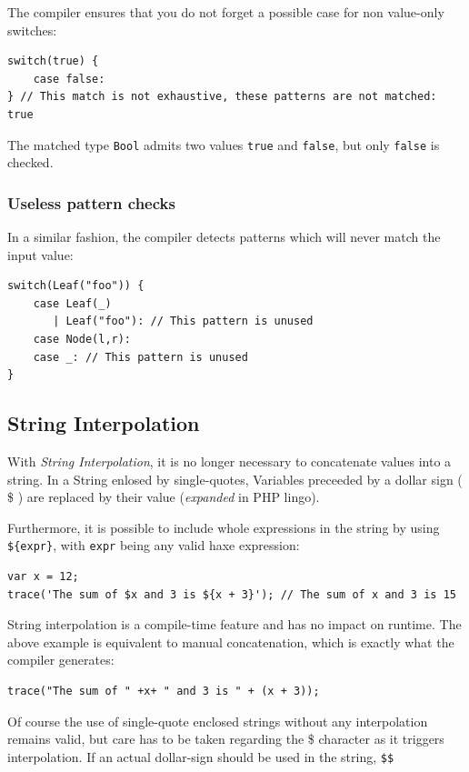 \documentclass{article}
\newcommand{\type}[1]{\texttt{#1}}
\newcommand{\expr}[1]{\texttt{#1}}
\newcommand{\haxe}[2][]{%
}
\begin{document}
The compiler ensures that you do not forget a possible case for non value-only switches:

\begin{lstlisting}
switch(true) {
    case false:
} // This match is not exhaustive, these patterns are not matched: true
\end{lstlisting}

The matched type \type{Bool} admits two values \expr{true} and \expr{false}, but only \expr{false} is checked. 


\subsubsection{Useless pattern checks}
\label{Useless pattern checks}

In a similar fashion, the compiler detects patterns which will never match the input value:

\begin{lstlisting}
switch(Leaf("foo")) {
    case Leaf(_)
       | Leaf("foo"): // This pattern is unused
    case Node(l,r):
    case _: // This pattern is unused
}
\end{lstlisting}



\subsection{String Interpolation}

With \emph{String Interpolation}, it is no longer necessary to concatenate values into a string. In a String enlosed by single-quotes, Variables preceeded by a dollar sign ( \$ ) are replaced by their value (\emph{expanded} in PHP lingo).  

\haxe{assets/StringInterpolation.hx}

Furthermore, it is possible to include whole expressions in the string by using \expr{\$\{expr\}}, with \expr{expr} being any valid haxe expression:

\begin{lstlisting}
var x = 12;
trace('The sum of $x and 3 is ${x + 3}'); // The sum of x and 3 is 15
\end{lstlisting} 
String interpolation is a compile-time feature and has no impact on runtime. The above example is equivalent to manual concatenation, which is exactly what the compiler generates:

\begin{lstlisting}
trace("The sum of " +x+ " and 3 is " + (x + 3));
\end{lstlisting}
Of course the use of single-quote enclosed strings without any interpolation remains valid, but care has to be taken regarding the \$ character as it triggers interpolation. If an actual dollar-sign should be used in the string, \expr{\$\$} 
\end{document}
